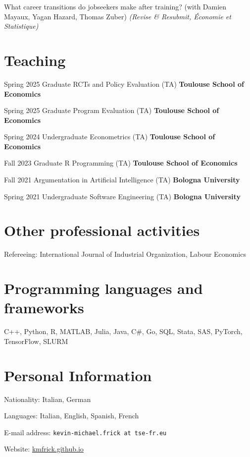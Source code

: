 \documentclass[11pt,a4paper]{article}
\begin{document}
\begin{cv}
 What career transitions do jobseekers make after training?  (with Damien Mayaux, Yagan Hazard, Thomas Zuber) \emph{(Revise \& Resubmit, Économie et Statistique)}



  \section*{Teaching}
  \begin{cvlist}{}
  \itemsep -5pt
  \item[Spring 2025] Graduate RCTs and Policy Evaluation (TA) \hfill \textbf{Toulouse School of Economics}
  \item[Spring 2025] Graduate Program Evaluation (TA) \hfill \textbf{Toulouse School of Economics}
\item[Spring 2024] Undergraduate Econometrics (TA) \hfill \textbf{Toulouse School of Economics}
\item[Fall 2023] Graduate R Programming (TA) \hfill \textbf{Toulouse School of Economics}
  \item[Fall 2021] Argumentation in Artificial Intelligence (TA) \hfill \textbf{Bologna University}
  \item[Spring 2021] Undergraduate Software Engineering (TA) \hfill \textbf{Bologna University}
  \end{cvlist}

\section*{Other professional activities}
Refereeing: International Journal of Industrial Organization, Labour Economics

\section*{Programming languages and frameworks}
    C++, Python, R, MATLAB, Julia, Java, C\#,  Go, SQL, Stata, SAS, PyTorch, TensorFlow, SLURM

\section*{Personal Information}
\begin{cvlist}{}
	\itemsep -5pt
	\item[Nationality:] Italian, German
  \item[Languages:]  Italian, English, Spanish, French
  \item[E-mail address:] \texttt{kevin-michael.frick at tse-fr.eu}
  \item[Website:] \url{kmfrick.github.io}
\end{cvlist}
\end{cv}
\end{document}
